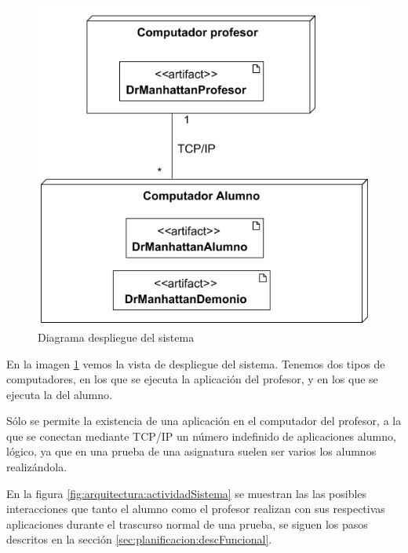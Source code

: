 \begin{figure}
    \centering
    \includegraphics[width=\linewidth]{arquitectura/despliegueSistema}
    \caption{Diagrama despliegue del sistema}
    \label{fig:arquitectura:despliegueSistema}
\end{figure}

En la imagen \ref{fig:arquitectura:despliegueSistema} vemos la vista de despliegue del sistema. Tenemos dos tipos de computadores, en los que se ejecuta la aplicación del profesor, y en los que se ejecuta la del alumno.
\newline

Sólo se permite la existencia de una aplicación en el computador del profesor, a la que se conectan mediante TCP/IP un número indefinido de aplicaciones alumno, lógico, ya que en una prueba de una asignatura suelen ser varios los alumnos realizándola.
\newline


En la figura \ref{fig:arquitectura:actividadSistema} se muestran las las posibles interacciones que tanto el alumno como el profesor realizan con sus respectivas aplicaciones durante el trascurso normal de una prueba, se siguen los pasos descritos en la sección \ref{sec:planificacion:descFuncional}.


